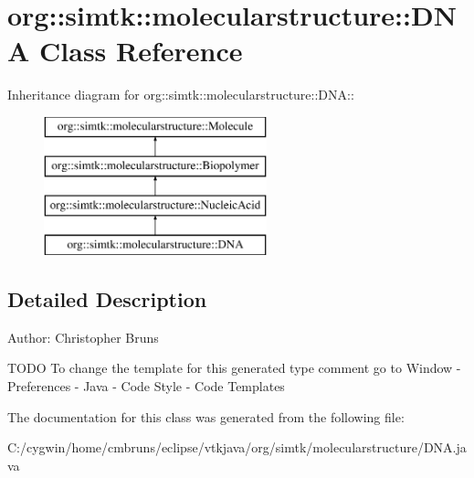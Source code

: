 \section{org::simtk::molecularstructure::DNA Class Reference}
\label{classorg_1_1simtk_1_1molecularstructure_1_1_d_n_a}
Inheritance diagram for org::simtk::molecularstructure::DNA::\begin{figure}[H]
\begin{center}
\leavevmode
\includegraphics[height=4cm]{classorg_1_1simtk_1_1molecularstructure_1_1_d_n_a}
\end{center}
\end{figure}


\subsection{Detailed Description}
\begin{Desc}
\item[Author:]Christopher Bruns\end{Desc}
TODO To change the template for this generated type comment go to Window - Preferences - Java - Code Style - Code Templates 



The documentation for this class was generated from the following file:\begin{CompactItemize}
\item 
C:/cygwin/home/cmbruns/eclipse/vtkjava/org/simtk/molecularstructure/DNA.java\end{CompactItemize}
